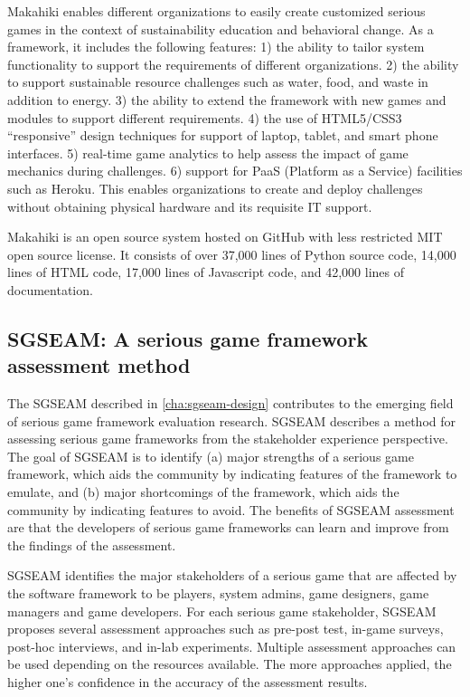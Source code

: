 Makahiki enables different organizations to easily create customized serious games in the context of sustainability education and behavioral change. As a framework, it includes the following features: 1) the ability to tailor system functionality to support the requirements of different organizations. 2) the ability to support sustainable resource challenges such as water, food, and waste in addition to energy. 3) the ability to extend the framework with new games and modules to support different requirements. 4) the use of HTML5/CSS3 ``responsive'' design techniques for support of laptop, tablet, and smart phone interfaces. 5) real-time game analytics to help assess the impact of game mechanics during challenges. 6) support for PaaS (Platform as a Service) facilities such as Heroku. This enables organizations to create and deploy challenges without obtaining physical hardware and its requisite IT support.

Makahiki is an open source system hosted on GitHub \cite{makahiki2} with less restricted MIT open source license. It  consists of over 37,000 lines of Python source code, 14,000 lines of HTML code,  17,000 lines of Javascript code, and 42,000 lines of documentation.

\subsection{SGSEAM: A serious game framework assessment method}

The SGSEAM described in \autoref{cha:sgseam-design} contributes to the emerging field of serious game framework evaluation research. SGSEAM describes a method for assessing serious game frameworks from the stakeholder experience perspective. The goal of SGSEAM is to identify (a) major strengths of a serious game framework, which aids the community by indicating features of the framework to emulate, and
(b) major shortcomings of the framework, which aids the community by indicating features to avoid.
The benefits of SGSEAM assessment are that the developers of serious game frameworks 
can learn and improve from the findings of the assessment.

SGSEAM identifies the major stakeholders of a serious game that are affected by the software framework to be players, system admins, game designers, game managers and game developers. For each serious game stakeholder, SGSEAM proposes several assessment approaches such as pre-post test, in-game surveys, post-hoc interviews, and in-lab experiments. Multiple assessment approaches can be used depending on the resources available. The more approaches applied, the higher one's confidence in the accuracy of the assessment results. 

